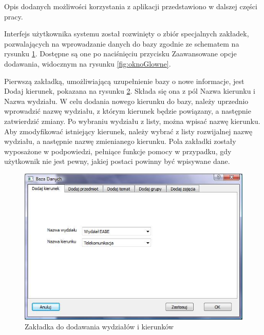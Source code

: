 \begin{figure}
\begin{center}
\label{fig:program}
\end{center}
\end{figure}

Opis dodanych możliwości korzystania z aplikacji przedstawiono w dalszej części pracy.

Interfejs użytkownika systemu został rozwinięty o zbiór specjalnych zakładek, pozwalających na wprowadzanie danych do bazy zgodnie ze schematem na rysunku \ref{fig:program}. Dostępne są one po naciśnięciu przycisku Zaawansowane opcje dodawania, widocznym na rysunku \ref{fig:oknoGlowne}. 

Pierwszą zakładką, umożliwiającą uzupełnienie bazy o nowe informacje, jest Dodaj kierunek, pokazana na rysunku \ref{fig:dodajSpecjalizacje}. Składa się ona z pól Nazwa kierunku i Nazwa wydziału. W celu dodania nowego kierunku do bazy, należy uprzednio wprowadzić nazwę wydziału, z którym kierunek będzie powiązany, a następnie zatwierdzić zmiany. Po wybraniu wydziału z listy, można wpisać nazwę kierunku. Aby zmodyfikować istniejący kierunek, należy wybrać z listy rozwijalnej nazwę wydziału, a następnie nazwę zmienianego kierunku. Pola zakładki zostały wyposażone w podpowiedzi, pełniące funkcje pomocy w przypadku, gdy użytkownik nie jest pewny, jakiej postaci powinny być wpisywane dane. 
\begin{figure}
\begin{center}
\includegraphics[scale=0.7]{dodaj_kierunek.jpg}
\caption{Zakładka do dodawania wydziałów i kierunków}
\label{fig:dodajSpecjalizacje}
\end{center}
\end{figure}


